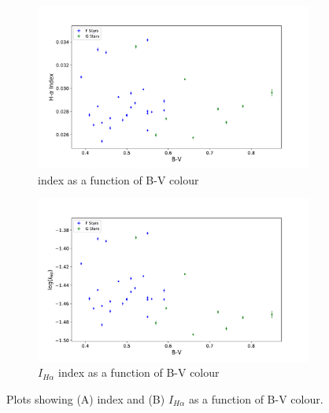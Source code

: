 \begin{figure}
    \centering
    \begin{subfigure}{\textwidth}
        \centering
        \includegraphics[scale=0.55]{Figures/4-Chromospheric_age/color_comparison_halpha.pdf}
        \caption{\Halpha index as a function of B-V colour}
    \end{subfigure}
    \begin{subfigure}{\textwidth}
        \centering
        \includegraphics[scale=0.55]{Figures/4-Chromospheric_age/color_comparison_IH.pdf}
        \caption{$I_{H\alpha}$ index as a function of B-V colour}
    \end{subfigure}
    \caption[\Halpha and $I_{H\alpha}$ index as a function of colour]{Plots showing (A) \Halpha index and (B) $I_{H\alpha}$ as a function of B-V colour.}
    \label{fig:halpha_colour_comparison}
\end{figure}

